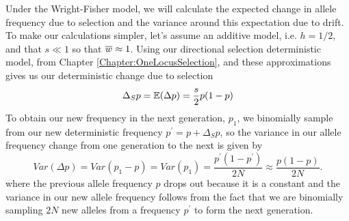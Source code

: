 {Under the Wright-Fisher model, we will calculate the expected change in allele frequency due to selection and the variance around this expectation due to drift. To make our calculations simpler, let's assume an additive model, i.e. $h=1/2$, and that $s \ll 1$ so that $\overline{w}
\approx 1$. Using our directional selection deterministic model, from Chapter
\ref{Chapter:OneLocusSelection}, and these approximations gives us our deterministic change due to selection
\begin{equation}
\Delta_S p = \mathbb{E}(\Delta p) = \frac{s}{2} p(1-p) \label{eqn:WF_mean}
\end{equation}
To obtain our new frequency in the next generation, $p_1$, we binomially sample from our new deterministic frequency $p^{\prime}= p + \Delta_S p$,
so the variance in our allele frequency change from one generation to the next is given by
\begin{equation}
Var(\Delta p) = Var(p_1 - p) = Var(p_1) = \frac{p^{\prime}(1-p^{\prime})}{2N} \approx  \frac{p(1-p)}{2N}. \label{eqn:WF_var}
\end{equation}
where the previous allele frequency $p$ drops out because it is a constant and the variance in our new allele frequency follows from the fact that we
are binomially sampling $2N$ new alleles from a frequency $p^{\prime}$ to form the next
generation. 

}
